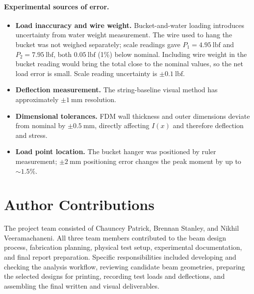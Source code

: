\documentclass[11pt,letterpaper]{article}
\begin{document}
\paragraph{Experimental sources of error.}
\begin{itemize}[noitemsep]
  \item \textbf{Load inaccuracy and wire weight.}  Bucket-and-water loading
    introduces uncertainty from water weight measurement.  The wire used to
    hang the bucket was not weighed separately; scale readings gave
    $P_1 = 4.95\ \mathrm{lbf}$ and $P_2 = 7.95\ \mathrm{lbf}$, both
    $0.05\ \mathrm{lbf}$ (1\%) below nominal.  Including wire weight
    in the bucket reading would bring the total close to the nominal values,
    so the net load error is small.  Scale reading uncertainty is
    $\pm 0.1\ \mathrm{lbf}$.
  \item \textbf{Deflection measurement.}  The string-baseline visual method
    has approximately $\pm 1\ \mathrm{mm}$ resolution.
  \item \textbf{Dimensional tolerances.}  FDM wall thickness and outer
    dimensions deviate from nominal by $\pm 0.5\ \mathrm{mm}$, directly
    affecting $I(x)$ and therefore deflection and stress.
  \item \textbf{Load point location.}  The bucket hanger was positioned
    by ruler measurement; $\pm 2\ \mathrm{mm}$ positioning error changes
    the peak moment by up to $\sim 1.5\%$.
\end{itemize}


\section{Author Contributions}
\label{sec:contributions}

The project team consisted of Chauncey Patrick, Brennan Stanley, and
Nikhil Veeramachaneni.  All three team members contributed to the beam
design process, fabrication planning, physical test setup, experimental
documentation, and final report preparation.  Specific responsibilities
included developing and checking the analysis workflow, reviewing candidate
beam geometries, preparing the selected designs for printing, recording test
loads and deflections, and assembling the final written and visual
deliverables.


\end{document}

